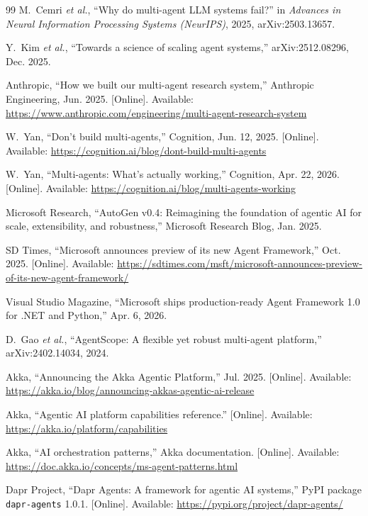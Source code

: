 \documentclass[conference,letterpaper]{IEEEtran}
\newcommand{\code}[1]{\texttt{#1}}
\begin{document}
\begin{thebibliography}{99}
M.~Cemri \emph{et al.}, ``Why do multi-agent LLM systems fail?'' in
\emph{Advances in Neural Information Processing Systems (NeurIPS)}, 2025,
arXiv:2503.13657.

Y.~Kim \emph{et al.}, ``Towards a science of scaling agent systems,''
arXiv:2512.08296, Dec. 2025.

Anthropic, ``How we built our multi-agent research system,'' Anthropic
Engineering, Jun. 2025. [Online]. Available:
\url{https://www.anthropic.com/engineering/multi-agent-research-system}

W.~Yan, ``Don't build multi-agents,'' Cognition, Jun. 12, 2025. [Online].
Available: \url{https://cognition.ai/blog/dont-build-multi-agents}

W.~Yan, ``Multi-agents: What's actually working,'' Cognition, Apr. 22,
2026. [Online]. Available:
\url{https://cognition.ai/blog/multi-agents-working}

Microsoft Research, ``AutoGen v0.4: Reimagining the foundation of agentic AI
for scale, extensibility, and robustness,'' Microsoft Research Blog, Jan.
2025.

SD Times, ``Microsoft announces preview of its new Agent Framework,'' Oct.
2025. [Online]. Available:
\url{https://sdtimes.com/msft/microsoft-announces-preview-of-its-new-agent-framework/}

Visual Studio Magazine, ``Microsoft ships production-ready Agent Framework
1.0 for .NET and Python,'' Apr. 6, 2026.

D.~Gao \emph{et al.}, ``AgentScope: A flexible yet robust multi-agent
platform,'' arXiv:2402.14034, 2024.

Akka, ``Announcing the Akka Agentic Platform,'' Jul. 2025. [Online].
Available: \url{https://akka.io/blog/announcing-akkas-agentic-ai-release}

Akka, ``Agentic AI platform capabilities reference.'' [Online]. Available:
\url{https://akka.io/platform/capabilities}

Akka, ``AI orchestration patterns,'' Akka documentation. [Online].
Available: \url{https://doc.akka.io/concepts/ms-agent-patterns.html}

Dapr Project, ``Dapr Agents: A framework for agentic AI systems,'' PyPI
package \code{dapr-agents} 1.0.1. [Online]. Available:
\url{https://pypi.org/project/dapr-agents/}


\end{thebibliography}
\end{document}
